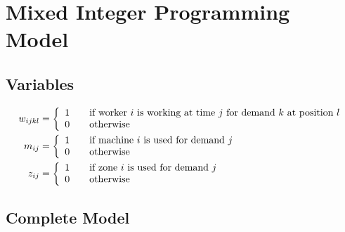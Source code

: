 \documentclass[../thesis.tex]{subfiles}
\begin{document}
\section{Mixed Integer Programming Model}

\subsection{Variables}

\begin{equation*}
\begin{split}
    w_{ijkl} &=  \left \{
                   \begin{array}{l l}
                      1 \quad & \textrm{if worker $i$ is working at time $j$ for demand $k$ at position $l$} \\
                      0 \quad & \textrm{otherwise} 
                   \end{array}
                   \right . \\
   m_{ij} &=  \left \{
                   \begin{array}{l l}
                      1 \quad & \textrm{if machine $i$ is used for demand $j$} \\
                      0 \quad & \textrm{otherwise} 
                   \end{array}
                   \right . \\
    z_{ij} &= \left \{
               \begin{array}{l l}
                  1 \quad & \textrm{if zone $i$ is used for demand $j$} \\
                  0 \quad & \textrm{otherwise} 
               \end{array}
               \right . \\
\end{split}
\end{equation*}


\subsection{Complete Model}
\end{document}
